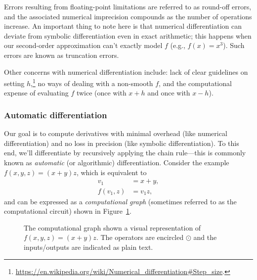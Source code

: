 Errors resulting from floating-point limitations are referred to as round-off errors, and the associated numerical imprecision compounds as the number of operations increase. An important thing to note here is that numerical differentiation can deviate from symbolic differentiation even in exact arithmetic; this happens when our second-order approximation can't exactly model $f$ (e.g., $f(x) = x^3$). Such errors are known as truncation errors.

Other concerns with numerical differentiation include: lack of clear guidelines on setting $h$,\footnote{\url{https://en.wikipedia.org/wiki/Numerical_differentiation\#Step_size}.} no ways of dealing with a non-smooth $f$, and the computational expense of evaluating $f$ twice (once with $x + h$ and once with $x - h$).

\subsubsection{Automatic differentiation}
\label{sec:2.2.3}

Our goal is to compute derivatives with minimal overhead (like numerical differentiation) and no loss in precision (like symbolic differentiation). To this end, we'll differentiate by recursively applying the chain rule---this is commonly known as \textit{automatic} (or algorithmic) differentiation. Consider the example $f(x, y, z) = (x + y) z$, which is equivalent to
\begin{align*}
    v_1 &= x + y, \\
    f(v_1, z) &= v_1 z,
\end{align*}
and can be expressed as a \textit{computational graph} (sometimes referred to as the computational circuit) shown in Figure~\ref{fig:1}.

\begin{figure}[!t]
\centering
{}
\caption{The computational graph shown a visual representation of $f(x, y, z) = (x + y) z$. The operators are encircled $\odot$ and the inputs/outputs are indicated as plain text.}
\label{fig:1}
\end{figure}

